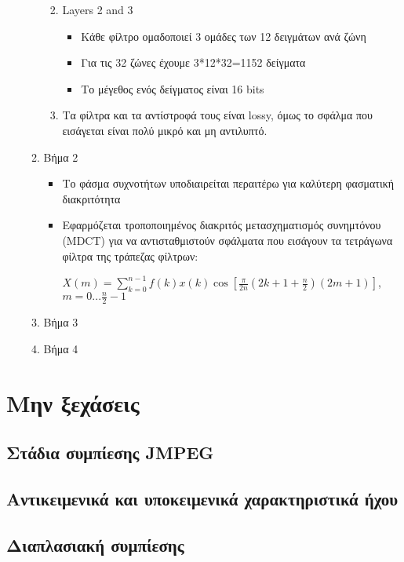 \documentclass[a4paper,12pt]{article}
\begin{document}
\begin{itemize}
\begin{enumerate}
\begin{enumerate}
\begin{itemize}
            \end{itemize}
            \item Layers 2 and 3
            \begin{itemize}
                \item Κάθε φίλτρο ομαδοποιεί 3 ομάδες των 12 δειγμάτων ανά ζώνη
                \item Για τις 32 ζώνες έχουμε 3*12*32=1152 δείγματα
                \item Το μέγεθος ενός δείγματος είναι 16 bits
            \end{itemize}
            \item Τα φίλτρα και τα αντίστροφά τους είναι lossy, όμως το σφάλμα που εισάγεται
            είναι πολύ μικρό και μη αντιλυπτό.
        \end{enumerate}
        \item Βήμα 2
        \begin{itemize}
            \item Το φάσμα συχνοτήτων υποδιαιρείται περαιτέρω για καλύτερη φασματική
            διακριτότητα
            \item Εφαρμόζεται τροποποιημένος διακριτός μετασχηματισμός συνημτόνου (MDCT) για να
            αντισταθμιστούν σφάλματα που εισάγουν τα τετράγωνα φίλτρα της τράπεζας φίλτρων:
            \begin{center}
                $X(m)=\sum_{k=0}^{n-1} {f(k)x(k)\cos[{\frac{\pi}{2n}(2k+1+\frac{n}{2})(2m+1)}]}$, $m=0...\frac{n}{2}-1$
            \end{center}
        \end{itemize}
        \item Βήμα 3
        \item Βήμα 4
    \end{enumerate}
\end{itemize}

\newpage\section{Μην ξεχάσεις}
\subsection{Στάδια συμπίεσης JMPEG}
\subsection{Αντικειμενικά και υποκειμενικά χαρακτηριστικά ήχου}
\subsection{Διαπλασιακή συμπίεσης}
\end{document}
